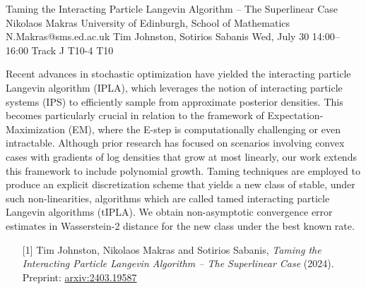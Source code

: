 \begin{talk}
\end{talk}

\begin{talk}
  {Taming the Interacting Particle Langevin Algorithm – The Superlinear Case}%
  {Nikolaos Makras}%
  {University of Edinburgh, School of Mathematics}%
  {N.Makras@sms.ed.ac.uk}%
  {Tim Johnston, Sotirios Sabanis}%
  {}%
  {Wed, July 30 14:00–16:00 Track J}%
  {T10-4}%
  {T10}%
  
				
			
Recent advances in stochastic optimization have yielded the interacting particle Langevin algorithm (IPLA), which leverages the notion of interacting particle systems (IPS) to efficiently sample from approximate posterior densities. This becomes particularly crucial in relation to the framework of Expectation-Maximization (EM), where the E-step is computationally challenging or even intractable. Although prior research has focused on scenarios involving convex cases with gradients of log densities that grow at most linearly, our work extends this framework to include polynomial growth. Taming techniques are employed to produce an explicit discretization scheme that yields a new class of stable, under such non-linearities, algorithms which are called tamed interacting particle Langevin algorithms (tIPLA). We obtain non-asymptotic convergence error estimates in Wasserstein-2 distance for the new class under the best known rate. 

\medskip

\begin{enumerate}
	\item[{[1]}] Tim Johnston, Nikolaos Makras and Sotirios Sabanis, {\it Taming the Interacting Particle Langevin Algorithm – The Superlinear Case} (2024). Preprint: \href{https://arxiv.org/abs/2403.19587}{arxiv:2403.19587} 
\end{enumerate}

\end{talk}


